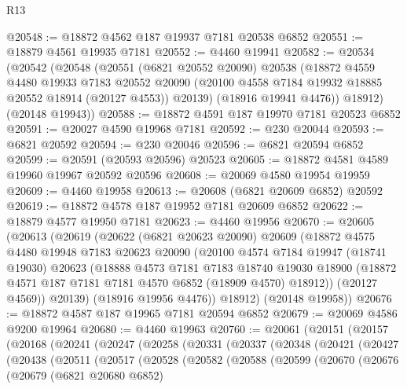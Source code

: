 \begin{lexlean}{R13}
\begin{coremodule}
@20548 := @18872 @4562 @187 @19937 @7181 @20538 @6852
@20551 := @18879 @4561 @19935 @7181
@20552 := @4460 @19941
@20582 := @20534
    (@20542
      (@20548
        (@20551
          (@6821 @20552 @20090)
          @20538
          (@18872
            @4559
            @4480
            @19933
            @7183
            @20552
            @20090
            (@20100 @4558 @7184 @19932 @18885 @20552 @18914 (@20127 @4553))
            @20139)
          (@18916 @19941 @4476))
        @18912)
      (@20148 @19943))
@20588 := @18872 @4591 @187 @19970 @7181 @20523 @6852
@20591 := @20027 @4590 @19968 @7181
@20592 := @230 @20044
@20593 := @6821 @20592
@20594 := @230 @20046
@20596 := @6821 @20594 @6852
@20599 := @20591 (@20593 @20596) @20523
@20605 := @18872 @4581 @4589 @19960 @19967 @20592 @20596
@20608 := @20069 @4580 @19954 @19959
@20609 := @4460 @19958
@20613 := @20608 (@6821 @20609 @6852) @20592
@20619 := @18872 @4578 @187 @19952 @7181 @20609 @6852
@20622 := @18879 @4577 @19950 @7181
@20623 := @4460 @19956
@20670 := @20605
    (@20613
      (@20619
        (@20622
          (@6821 @20623 @20090)
          @20609
          (@18872
            @4575
            @4480
            @19948
            @7183
            @20623
            @20090
            (@20100
              @4574
              @7184
              @19947
              (@18741 @19030)
              @20623
              (@18888
                @4573
                @7181
                @7183
                @18740
                @19030
                @18900
                (@18872 @4571 @187 @7181 @7181 @4570 @6852 (@18909 @4570) @18912))
              (@20127 @4569))
            @20139)
          (@18916 @19956 @4476))
        @18912)
      (@20148 @19958))
@20676 := @18872 @4587 @187 @19965 @7181 @20594 @6852
@20679 := @20069 @4586 @9200 @19964
@20680 := @4460 @19963
@20760 := @20061
    (@20151
      (@20157
        (@20168
          (@20241
            (@20247
              (@20258
                (@20331
                  (@20337
                    (@20348
                      (@20421
                        (@20427
                          (@20438
                            (@20511
                              (@20517
                                (@20528
                                  (@20582
                                    (@20588
                                      (@20599
                                        (@20670
                                          (@20676
                                            (@20679
                                              (@6821 @20680 @6852)

\end{coremodule}
\end{lexlean}
